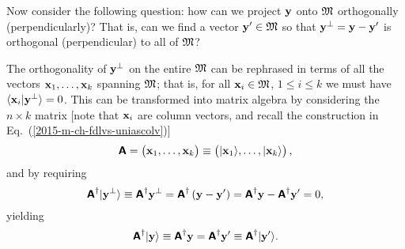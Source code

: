 Now consider the following question:
how can we project ${\bf y}$ onto ${\frak M}$ orthogonally (perpendicularly)?
That is, can we find a vector ${\bf y}' \in {\frak M}$ so that ${\bf y}^\perp = {\bf y} - {\bf y}'$
is orthogonal (perpendicular) to all of ${\frak M}$?

The orthogonality of ${\bf y}^\perp$ on the entire ${\frak M}$ can be rephrased in terms
of all the vectors ${\bf x}_1,\ldots ,{\bf x}_k$ spanning ${\frak M}$; that is,
for all ${\bf x}_i \in {\frak M}$, $1\le i\le k$
we must have
$\langle {\bf x}_i \vert {\bf y}^\perp \rangle = 0$.
This can be transformed into matrix algebra by considering the $n \times k$ matrix
[note that ${\bf x}_i$ are column vectors,
and recall the construction in Eq.~(\ref{2015-m-ch-fdlvs-uniascolv})]
\begin{equation}
\textsf{\textbf{A}} = \begin{pmatrix}
{\bf x}_1, \ldots ,{\bf x}_k
\end{pmatrix}
\equiv
\begin{pmatrix}
\vert {\bf x}_1\rangle , \ldots , \vert {\bf x}_k \rangle
\end{pmatrix},
\end{equation}
and by requiring
\begin{equation}
\textsf{\textbf{A}}^\dagger \vert {\bf y}^\perp \rangle   \equiv
 \textsf{\textbf{A}}^\dagger  {{\bf y}^\perp} =
 \textsf{\textbf{A}}^\dagger  \left({\bf y} - {\bf y}'\right) =
 \textsf{\textbf{A}}^\dagger {\bf y}  - \textsf{\textbf{A}}^\dagger {{\bf y}'}   =
0,
\end{equation}
yielding
\begin{equation}
 \textsf{\textbf{A}}^\dagger  \vert  {\bf y}  \rangle
\equiv
 \textsf{\textbf{A}}^\dagger   {\bf y}
=
\textsf{\textbf{A}}^\dagger  {{\bf y}'}
\equiv
\textsf{\textbf{A}}^\dagger \vert {\bf y}' \rangle .
\label{2015-m-ch-cfvs-opab1}
\end{equation}

